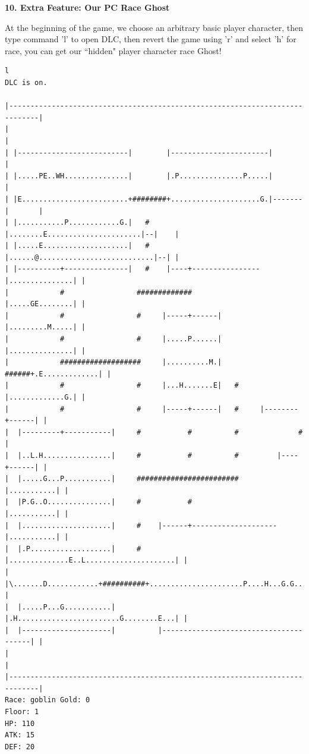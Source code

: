 \documentclass[11pt]{article}
\theoremstyle{plain}
\begin{document}
\newpage
\textbf{10. Extra Feature: Our PC Race Ghost}

At the beginning of the game, we choose an arbitrary basic player character,
then type command 'l' to open DLC, then revert the game using 'r' and 
select 'h' for race, you can get our ``hidden" player character race
Ghost!

\begin{Verbatim}[fontsize=\scriptsize]
l
DLC is on.

|-----------------------------------------------------------------------------|
|                                                                             |
| |--------------------------|        |-----------------------|               |
| |.....PE..WH...............|        |.P...............P.....|               |
| |E.........................+########+.....................G.|-------|       |
| |...........P............G.|   #    |........E......................|--|    |
| |.....E....................|   #    |......@...........................|--| |
| |----------+---------------|   #    |----+----------------|...............| |
|            #                 #############                |.....GE........| |
|            #                 #     |-----+------|         |.........M.....| |
|            #                 #     |.....P......|         |...............| |
|            ###################     |..........M.|   ######+.E.............| |
|            #                 #     |...H.......E|   #     |.............G.| |
|            #                 #     |-----+------|   #     |--------+------| |
|  |---------+-----------|     #           #          #              #        |
|  |..L.H................|     #           #          #         |----+------| |
|  |.....G...P...........|     ########################         |...........| |
|  |P.G..O...............|     #           #                    |...........| |
|  |.....................|     #    |------+--------------------|...........| |
|  |.P...................|     #    |..............E..L.....................| |
|  |\.......D............+##########+......................P....H...G.G.....| |
|  |.....P...G...........|          |.H........................G........E...| |
|  |---------------------|          |---------------------------------------| |
|                                                                             |
|-----------------------------------------------------------------------------|
Race: goblin Gold: 0                                                   Floor: 1
HP: 110
ATK: 15
DEF: 20


\end{Verbatim}
\end{document}
